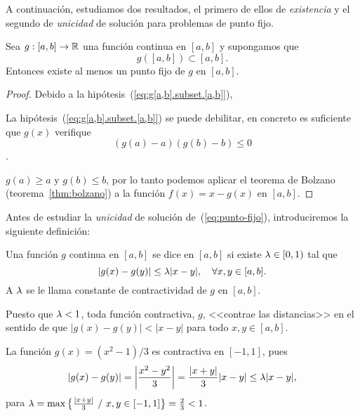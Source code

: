 A continuación, estudiamos dos resultados, el primero de ellos de
\textit{existencia} y el segundo de \textit{unicidad} de solución para
problemas de punto fijo.

\begin{proposition}
  \label{pro:existencia-punto-fijo}
  Sea $g:[a,b]\to\operatorname{{\mathbb R}}$ una función continua en $[a,b]$ y supongamos
  que
  \begin{equation}
    g([a,b])\subset [a,b].
    \label{eq:g[a,b].subset.[a,b]}
  \end{equation}
  Entonces existe al menos un punto fijo de $g$ en $[a,b]$.
\end{proposition}
\begin{proof}
  Debido a la hipótesis~(\ref{eq:g[a,b].subset.[a,b]}),
  \begin{extension}
    La hipótesis~(\ref{eq:g[a,b].subset.[a,b]}) se puede debilitar, en
    concreto es suficiente que $g(x)$ verifique
    $$(g(a)-a)(g(b)-b)\le 0$$.
  \end{extension}
  $g(a)\ge a$ y
  $g(b)\le b$, por lo tanto podemos aplicar el teorema de Bolzano
  (teorema~\ref{thm:bolzano}) a la función $f(x)=x-g(x)$ en $[a,b]$.
\end{proof}


Antes de estudiar la \textit{unicidad} de solución de~(\ref{eq:punto-fijo}),
introduciremos la siguiente definición:

\begin{definition}
  Una función $g$ continua en $[a,b]$ se dice  en
  $[a,b]$ si existe $\lambda\in[0,1)$ tal que
  \begin{equation*}
    |g(x)-g(y)| \le \lambda |x-y|, \quad \forall x,y \in [a,b].
    \label{eq:contractividad}
  \end{equation*}
  A $\lambda$ se le llama constante de contractividad de $g$ en $[a,b]$.
  \label{def:funcion.contractiva}
\end{definition}

Puesto que $\lambda<1$, toda función contractiva, $g$, <<contrae las
distancias>> en el sentido de que $|g(x)-g(y)|<|x-y|$ para todo
$x,y\in [a,b]$.


\begin{example}
  La función $g(x)=(x^2-1)/3$ es contractiva en $[-1,1]$, pues
  $$
  |g(x)-g(y)|=\left|\frac{x^2-y^2}{3}\right| = \frac{|x+y|}{3}|x-y| \le
  \lambda |x-y|,
  $$
  para $\lambda=\max \big\{ \frac{|x+y|}{3}\ /\ x,y\in [-1,1]
  \big\} =\frac23 <1$.
\end{example}

